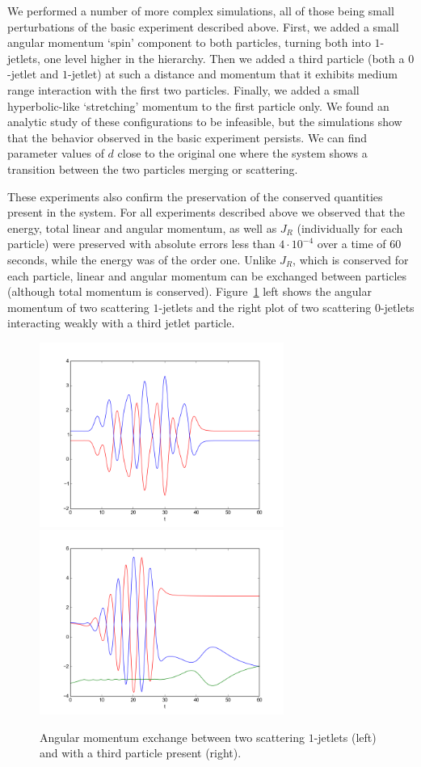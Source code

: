\documentclass[12pt]{amsart}
\begin{document}
We performed a number of more complex simulations, all of
those being small perturbations of the basic experiment described
above. First, we added a small angular momentum `spin' component to
both particles, turning both into $1$-jetlets, one level higher in the
hierarchy. Then we added a third particle (both a $0$-jetlet and
$1$-jetlet) at such a distance and momentum that it exhibits medium
range interaction with the first two particles. Finally, we added a
small hyperbolic-like `stretching' momentum to the first particle
only. We found an analytic study of these configurations to be
infeasible, but the simulations show that the behavior observed in the basic
experiment persists. We can find parameter values of $d$ close to the
original one where the system shows a transition between the two
particles merging or scattering.

These experiments also confirm the preservation of the conserved
quantities present in the system. For all experiments described above
we observed that the energy, total linear and angular momentum,
as well as $J_R$ (individually for each particle) were
preserved with absolute errors less than $4 \cdot 10^{-4}$ over a time
of $60$ seconds, while the energy was of the order one. Unlike $J_R$,
which is conserved for each particle, linear and angular momentum can be
exchanged between particles (although total momentum is conserved).
Figure~\ref{fig:angmom-exchange} left shows
the angular momentum of two scattering $1$-jetlets and
the right plot of two scattering $0$-jetlets
interacting weakly with a third jetlet particle.

\begin{figure}[htb]
  \centering
  \includegraphics[width=8cm]{angmom-1jetlets}
  \includegraphics[width=8cm]{angmom-3rd-jetlet}
  \caption{Angular momentum exchange between two scattering
    $1$-jetlets (left) and with a third particle present (right).}
  \label{fig:angmom-exchange}
\end{figure}
\end{document}

